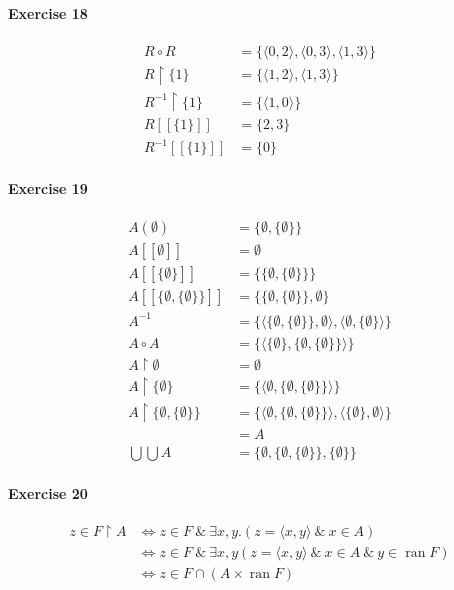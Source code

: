 \documentclass{report}
\newcommand{\ran}{\ensuremath{\operatorname{ran}}}
\begin{document}
    \paragraph{Exercise 18}
    \begin{align*}
        R \circ R & = \{ \langle 0,2 \rangle, \langle 0,3 \rangle, \langle 1,3 \rangle \} \\
        R \restriction \{ 1 \} & = \{ \langle 1,2 \rangle, \langle 1,3 \rangle \} \\
        R^{-1} \restriction \{ 1 \} & = \{ \langle 1, 0 \rangle \} \\
        R [\![ \{ 1 \} ]\!] & = \{ 2, 3 \} \\
        R^{-1} [\![ \{1\} ]\!] & = \{ 0 \}
    \end{align*}

    \paragraph{Exercise 19}
    \begin{align*}
        A(\emptyset) & = \{ \emptyset, \{ \emptyset \} \} \\
        A [\![ \emptyset ]\!] & = \emptyset \\
        A [\![ \{ \emptyset \} ]\!] & = \{ \{ \emptyset, \{ \emptyset \} \} \} \\
        A [\![ \{ \emptyset, \{ \emptyset \} \} ]\!] & = \{ \{ \emptyset, \{ \emptyset \} \}, \emptyset \} \\
        A^{-1} & = \{ \langle \{ \emptyset, \{ \emptyset \} \}, \emptyset \rangle,
        \langle \emptyset, \{ \emptyset \} \rangle \} \\
        A \circ A & = \{ \langle \{ \emptyset \}, \{ \emptyset, \{ \emptyset \} \} \rangle \} \\
        A \restriction \emptyset & = \emptyset \\
        A \restriction \{ \emptyset \} & = \{ \langle \emptyset, \{ \emptyset, \{ \emptyset \} \} \rangle \} \\
        A \restriction \{ \emptyset, \{ \emptyset \} \} & = \{ \langle \emptyset, \{ \emptyset, \{ \emptyset \} \} \rangle,
        \langle \{ \emptyset \}, \emptyset \rangle \} \\
        & = A \\
        \bigcup \bigcup A & = \{ \emptyset , \{ \emptyset, \{ \emptyset \} \},
        \{ \emptyset \} \} 
    \end{align*}

    \paragraph{Exercise 20}
    \begin{align*}
        z \in F \restriction A & \Leftrightarrow z \in F \ \&\ \exists x,y. (z = \langle x,y \rangle \ \&\ x \in A) \\
        & \Leftrightarrow z \in F \ \&\ \exists x,y (z = \langle x,y \rangle \ \&\ x \in A \ \&\ y \in \ran F) \\
        & \Leftrightarrow z \in F \cap (A \times \ran F)
    \end{align*}
\end{document}
